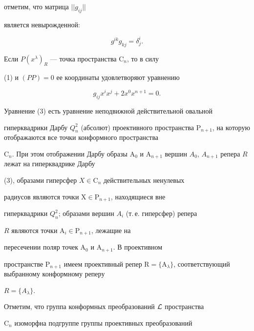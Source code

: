 отметим, что матрица $||g_{ij}||$ 


является невырожденной: 


\begin{equation} 


g^{ik}g_{kj}=\delta^i_j. 


\end{equation} 


 


Если $P(x^\lambda)_R$ --- точка пространства $\mathrm C_n$, то в силу 


(1) и $(PP)=0$ ее координаты удовлетворяют уравнению 


\begin{equation} 


g_{ij}x^i x^j+2x^0x^{n+1}=0. 


\end{equation} 


Уравнение (3) есть уравнение неподвижной действительной овальной 


гиперквадрики Дарбу $Q^2_n$ (абсолют) проективного пространства $\mathrm 


P_{n+1}$, на которую отображаются все точки конформного пространства 


$\mathrm C_n$. При этом отображении Дарбу образы $\mathrm A_0$ и $\mathrm 


A_{n+1}$ вершин $A_0$, $A_{n+1}$ репера $R$ лежат на гиперквадрике Дарбу 


(3), образами гиперсфер $X\in\mathrm C_n$ действительных ненулевых 


радиусов являются точки $\mathrm X\in\mathrm P_{n+1}$, находящиеся вне 


гиперквадрики $Q^2_n$; образами вершин $A_i$ (т.\,е. гиперсфер) репера 


$R$ являются точки $\mathrm A_i\in\mathrm P_{n+1}$, лежащие на 


пересечении поляр точек $\mathrm A_0$ и $\mathrm A_{n+1}$. В проективном 


пространстве $\mathrm P_{n+1}$ имеем проективный репер $\mathrm 


R=\{\mathrm A_\lambda\}$, соответствующий выбранному конформному реперу 


$R=\{A_\lambda\}$. 


 


Отметим, что группа конформных преобразований $\cal L$ пространства 


$\mathrm C_n$ изоморфна подгруппе группы проективных преобразований 



